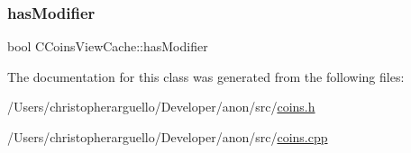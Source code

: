 \subsubsection{\texorpdfstring{has\+Modifier}{hasModifier}}
{\footnotesize\ttfamily bool C\+Coins\+View\+Cache\+::has\+Modifier\hspace{0.3cm}{\ttfamily [protected]}}



The documentation for this class was generated from the following files\+:\begin{DoxyCompactItemize}
\item 
/\+Users/christopherarguello/\+Developer/anon/src/\mbox{\hyperlink{coins_8h}{coins.\+h}}\item 
/\+Users/christopherarguello/\+Developer/anon/src/\mbox{\hyperlink{coins_8cpp}{coins.\+cpp}}\end{DoxyCompactItemize}
